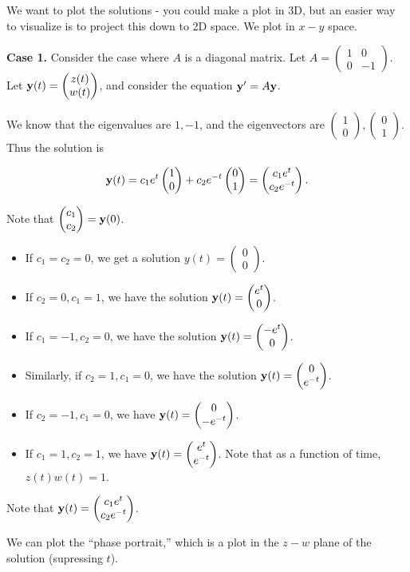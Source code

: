 \documentclass{article}
\newcommand{\mat}[1]{\begin{pmatrix}#1\end{pmatrix}}
\begin{document}
We want to plot the solutions - you could make a plot in 3D, but an easier way to visualize is to project this down to 2D space.  We plot in $x-y$ space.

{\bf Case 1.} Consider the case where $A$ is a diagonal matrix. Let $A = \mat{1 & 0 \\ 0 & -1}$.  Let $\mbf{y}(t) = \mat{z(t) \\ w(t)}$, and consider the equation $\mathbf{y}' = A \mathbf{y}$.

We know that the eigenvalues are $1, -1$, and the eigenvectors are $\mat{1 \\ 0}, \mat{0 \\ 1}$.  Thus the solution is

\begin{align*}
  \mbf{y}(t) = c_1 e^t \mat{1 \\ 0} + c_2 e^{-t} \mat{0 \\ 1} = \mat{c_1 e^t \\ c_2 e^{-t}}.
\end{align*}

Note that $\mat{c_1 \\ c_2} = \mbf{y}(0)$.

\begin{itemize}
  \item If $c_1 = c_2 = 0$, we get a solution $y(t) = \mat{0 \\ 0}$.
  \item If $c_2 = 0, c_1 = 1$, we have the solution $\mbf{y}(t) = \mat{e^t \\ 0}$.
  \item If $c_1 = -1, c_2 = 0$, we have the solution $\mbf{y}(t) = \mat{- e^t \\ 0}$.
  \item Similarly, if $c_2 = 1, c_1 = 0$, we have the solution $\mbf{y}(t) = \mat{0 \\ e^{-t}}$.
  \item If $c_2 = -1, c_1 = 0$, we have $\mbf{y}(t) = \mat{0 \\ - e^{-t}}$.
  \item If $c_1 = 1, c_2 = 1$, we have $\mbf{y}(t) = \mat{e^t \\ e^{-t}}$.  Note that as a function of time, $z(t) w(t) = 1$.
\end{itemize}

Note that $\mbf{y}(t) = \mat{c_1 e^t \\ c_2 e^{-t}}$.

We can plot the ``phase portrait,'' which is a plot in the $z-w$ plane of the solution (supressing $t$).
\end{document}
